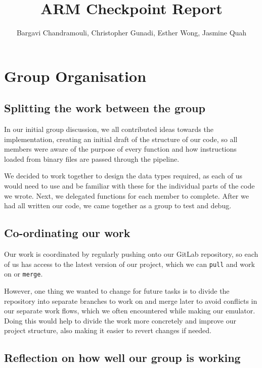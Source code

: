 \documentclass[11pt]{article}
\begin{document}
\title{ARM Checkpoint Report}
\author{Bargavi Chandramouli, Christopher Gunadi, Esther Wong, Jasmine Quah}

\maketitle
\setlength{\parindent}{1cm}

\section{Group Organisation}

\subsection{Splitting the work between the group}

In our initial group discussion, we all contributed ideas towards the implementation, creating an initial draft of the structure of our code, so all members were aware of the purpose of every function and how instructions loaded from binary files are passed through the pipeline.

We decided to work together to design the data types required, as each of us would need to use and be familiar with these for the individual parts of the code we wrote. Next, we delegated functions for each member to complete. After we had all written our code, we came together as a group to test and debug.

\subsection{Co-ordinating our work}

Our work is coordinated by regularly pushing onto our GitLab repository, so each of us has access to the latest version of our project, which we can \texttt{pull} and work on or \texttt{merge}.

However, one thing we wanted to change for future tasks is to divide the repository into separate branches to work on and merge later to avoid conflicts in our separate work flows, which we often encountered while making our emulator. Doing this would help to divide the work more concretely and improve our project structure, also making it easier to revert changes if needed.

\subsection{Reflection on how well our group is working}
\end{document}
